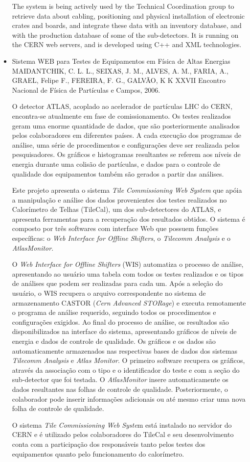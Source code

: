 \begin{itemize}
The system is being actively used by the Technical Coordination group to
retrieve data about cabling, positioning and physical installation of
electronic crates and boards, and integrate these data with an inventory
database, and with the production database of some of the sub-detectors. It is
running on the CERN web servers, and is developed using C++ and XML
technologies.


\item Sistema WEB para Testes de Equipamentos em Física de Altas Energias
MAIDANTCHIK, C. L. L., SEIXAS, J. M., ALVES, A. M., FARIA, A., GRAEL,
Felipe F., FEREIRA, F. G., GALVÃO, K K
XXVII Encontro Nacional de Física de Partículas e Campos, 2006.

O detector ATLAS, acoplado ao acelerador de partículas LHC do CERN, encontra-se
atualmente em fase de comissionamento. Os testes realizados geram uma enorme
quantidade de dados, que são posteriormente analisados pelos colaboradores em
diferentes países. A cada execução dos programas de análise, uma série de
procedimentos e configurações deve ser realizada pelos pesquisadores. Os
gráficos e histogramas resultantes se referem aos níveis de energia durante uma
colisão de partículas, e dados para o controle de qualidade dos equipamentos
também são gerados a partir das análises.

Este projeto apresenta o sistema \emph{Tile Commissioning Web System} que apóia
a manipulação e análise dos dados provenientes dos testes realizados no
Calorímetro de Telhas (TileCal), um dos sub-detectores do ATLAS, e apresenta
ferramentas para a recuperação dos resultados obtidos. O sistema é composto por
três softwares com interface Web que possuem funções específicas: o \emph{Web
Interface for Offline Shifters}, o \emph{Tilecomm Analysis} e o
\emph{AtlasMonitor}.

O \emph{Web Interface for Offline Shifters} (WIS) automatiza o processo de
análise, apresentando ao usuário uma tabela com todos os testes realizados e os
tipos de análises que podem ser realizadas para cada um. Após a seleção do
usuário, o WIS recupera o arquivo correspondente no sistema de armazenamento
CASTOR (\emph{Cern Advanced STORage}) e executa remotamente o programa de
análise requerido, seguindo todos os procedimentos e configurações exigidos. Ao
final do processo de análise, os resultados são disponibilizados na interface
do sistema, apresentando gráficos de níveis de energia e dados de controle de
qualidade. Os gráficos e os dados são automaticamente armazenados nas
respectivas bases de dados dos sistemas \emph{Tilecomm Analysis} e \emph{Atlas
Monitor}. O primeiro software recupera os gráficos, através da associação com o
tipo e o identificador do teste e com a seção do sub-detector que foi testada.
O \emph{AtlasMonitor} insere automaticamente os dados resultantes nas folhas de
controle de qualidade. Posteriormente, o colaborador pode inserir informações
adicionais ou até mesmo criar uma nova folha de controle de qualidade.

O sistema \emph{Tile Commissioning Web Syste}m está instalado no servidor do
CERN e é utilizado pelos colaboradores do TileCal e seu desenvolvimento conta
com a participação dos responsáveis tanto pelos testes dos equipamentos quanto
pelo funcionamento do calorímetro.


\end{itemize}
